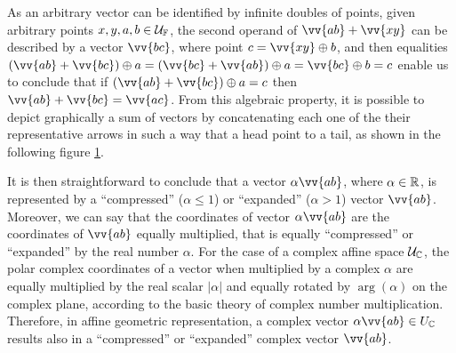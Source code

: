 As an arbitrary vector can be identified by infinite doubles of points, given arbitrary points $x,y,a,b\in{\mathcal{U}}_{\mathbb{F}}$, the second operand of $\vv{ab}+\vv{xy}$ can be described by a vector $\vv{bc}$, where point $c=\vv{xy}\oplus b$, and then equalities $(\vv{ab}+\vv{bc})\oplus a=(\vv{bc}+\vv{ab})\oplus a=\vv{bc}\oplus b=c$ enable us to conclude that if $(\vv{ab}+\vv{bc})\oplus a=c$ then $\vv{ab}+\vv{bc}=\vv{ac}$. From this algebraic property, it is possible to depict graphically a sum of vectors by concatenating each one of the their representative arrows in such a way that a head point to a tail, as shown in the following figure \ref{fg:vetorSoma}.
\begin{figure}[!ht]
\centering
\begin{center}
\scalebox{.72}{}
\end{center}
\label{fg:vetorSoma}
\end{figure}
It is then straightforward to conclude that a vector $\alpha\vv{ab}$, where $\alpha\in\mathbb{R}$, is represented by a ``compressed'' ($\alpha\leq 1$) or ``expanded'' ($\alpha >1$) vector $\vv{ab}$. Moreover, we can say that the coordinates of vector $\alpha\vv{ab}$ are the coordinates of $\vv{ab}$ equally multiplied, that is equally ``compressed'' or ``expanded'' by the real number $\alpha$. For the case of a complex affine space ${\mathcal{U}}_{\mathbb{C}}$, the polar complex coordinates of a vector when multiplied by a complex $\alpha$ are equally multiplied by the real scalar $|\alpha|$ and equally rotated by $\arg{(\alpha)}$ on the complex plane, according to the basic theory of complex number multiplication. Therefore, in affine geometric representation, a complex vector $\alpha\vv{ab}\in U_\cam{C}$ results also in a ``compressed'' or ``expanded'' complex vector $\vv{ab}$.

